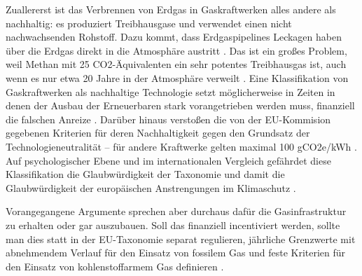 Zuallererst ist das Verbrennen von Erdgas in Gaskraftwerken alles andere als nachhaltig: es produziert Treibhausgase und verwendet einen nicht nachwachsenden Rohstoff. Dazu kommt, dass Erdgaspipelines Leckagen haben über die Erdgas direkt in die Atmosphäre austritt \cite{reuters}. Das ist ein großes Problem, weil Methan mit 25 CO2-Äquivalenten ein sehr potentes Treibhausgas ist, auch wenn es nur etwa 20 Jahre in der Atmosphäre verweilt \cite{uba-co2e}.
Eine Klassifikation von Gaskraftwerken als nachhaltige Technologie setzt möglicherweise in Zeiten in denen der Ausbau der Erneuerbaren stark vorangetrieben werden muss, finanziell die falschen Anreize \cite{uba}. Darüber hinaus verstoßen die von der EU-Kommision gegebenen Kriterien für deren Nachhaltigkeit gegen den Grundsatz der Technologieneutralität -- für andere Kraftwerke gelten maximal 100 gCO2e/kWh \cite{uba}.
Auf psychologischer Ebene und im internationalen Vergleich gefährdet diese Klassifikation die Glaubwürdigkeit der Taxonomie und damit die Glaubwürdigkeit der europäischen Anstrengungen im Klimaschutz \cite{dnr}.

Vorangegangene Argumente sprechen aber durchaus dafür die Gasinfrastruktur zu erhalten oder gar auszubauen. Soll das finanziell incentiviert werden, sollte man dies statt in der EU-Taxonomie separat regulieren, jährliche Grenzwerte mit abnehmendem Verlauf für den Einsatz von fossilem Gas und feste Kriterien für den Einsatz von kohlenstoffarmem Gas definieren \cite{uba}.

